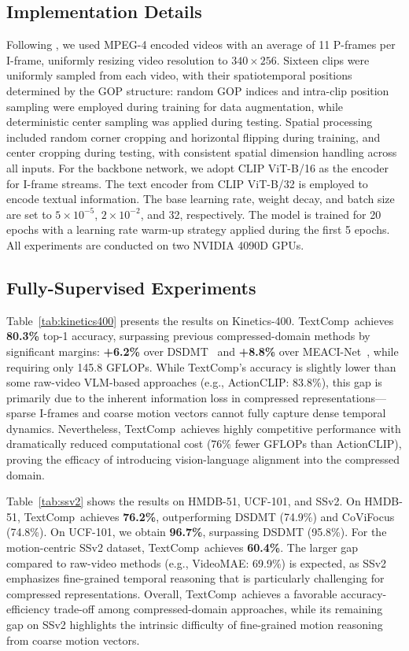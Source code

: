 \documentclass[letterpaper]{article} %
\newcommand{\methodname}{TextComp}
\begin{document}
\subsection{Implementation Details}

Following \cite{wu2018compressed}, we used MPEG-4 encoded videos with an average of 11 P-frames per I-frame, uniformly resizing video resolution to $340 \times 256$. Sixteen clips were uniformly sampled from each video, with their spatiotemporal positions determined by the GOP structure: random GOP indices and intra-clip position sampling were employed during training for data augmentation, while deterministic center sampling was applied during testing. Spatial processing included random corner cropping and horizontal flipping during training, and center cropping during testing, with consistent spatial dimension handling across all inputs. For the backbone network, we adopt CLIP ViT-B/16 as the encoder for I-frame streams. The text encoder from CLIP ViT-B/32 is employed to encode textual information. The base learning rate, weight decay, and batch size are set to $5\times 10^{-5}$, $2\times 10^{-2}$, and 32, respectively. The model is trained for 20 epochs with a learning rate warm-up strategy applied during the first 5 epochs. All experiments are conducted on two NVIDIA 4090D GPUs.



\subsection{Fully-Supervised Experiments}
Table~\ref{tab:kinetics400} presents the results on Kinetics-400. \methodname~achieves \textbf{80.3\%} top-1 accuracy, surpassing previous compressed-domain methods by significant margins: \textbf{+6.2\%} over DSDMT~\cite{DSDMT} and \textbf{+8.8\%} over MEACI-Net~\cite{li2022representation}, while requiring only 145.8 GFLOPs. While \methodname's accuracy is slightly lower than some raw-video VLM-based approaches (e.g., ActionCLIP: 83.8\%), this gap is primarily due to the inherent information loss in compressed representations—sparse I-frames and coarse motion vectors cannot fully capture dense temporal dynamics. Nevertheless, \methodname~achieves highly competitive performance with dramatically reduced computational cost (76\% fewer GFLOPs than ActionCLIP), proving the efficacy of introducing vision-language alignment into the compressed domain.

Table~\ref{tab:ssv2} shows the results on HMDB-51, UCF-101, and SSv2. On HMDB-51, \methodname~achieves \textbf{76.2\%}, outperforming DSDMT (74.9\%) and CoViFocus (74.8\%). On UCF-101, we obtain \textbf{96.7\%}, surpassing DSDMT (95.8\%). For the motion-centric SSv2 dataset, \methodname~achieves \textbf{60.4\%}. The larger gap compared to raw-video methods (e.g., VideoMAE: 69.9\%) is expected, as SSv2 emphasizes fine-grained temporal reasoning that is particularly challenging for compressed representations. Overall, \methodname~achieves a favorable accuracy-efficiency trade-off among compressed-domain approaches, while its remaining gap on SSv2 highlights the intrinsic difficulty of fine-grained motion reasoning from coarse motion vectors.
\end{document}
